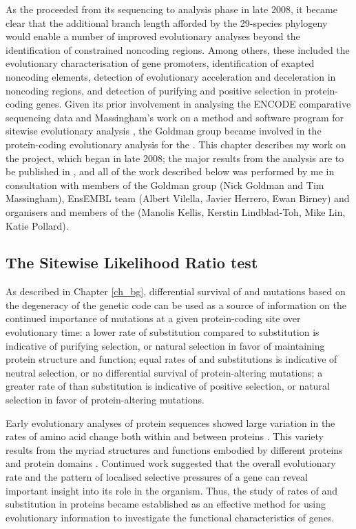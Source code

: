 As the \mgp proceeded from its sequencing to analysis phase in late
2008, it became clear that the additional branch length afforded by
the 29-species phylogeny would enable a number of improved
evolutionary analyses beyond the identification of constrained
noncoding regions. Among others, these included the evolutionary
characterisation of gene promoters, identification of exapted
noncoding elements, detection of evolutionary acceleration and
deceleration in noncoding regions, and detection of purifying and
positive selection in protein-coding genes. Given its prior
involvement in analysing the ENCODE comparative sequencing data
\citep{TODO} and Massingham's work on a method and software program
for sitewise evolutionary analysis \citep{TODO}, the Goldman group
became involved in the protein-coding evolutionary analysis for the
\mgp. This chapter describes my work on the project, which began in
late 2008; the major results from the analysis are to be published in
\citep{TODO}, and all of the work described below was performed by me
in consultation with members of the Goldman group (Nick Goldman and
Tim Massingham), EnsEMBL team (Albert Vilella, Javier Herrero, Ewan
Birney) and organisers and members of the \mgp (Manolis Kellis,
Kerstin Lindblad-Toh, Mike Lin, Katie Pollard).

\subsection{The Sitewise Likelihood Ratio test}

As described in Chapter \ref{ch_bg}, differential survival of \nsyn
and \syn mutations based on the degeneracy of the genetic code can be
used as a source of information on the continued importance of
mutations at a given protein-coding site over evolutionary time: a
lower rate of \nsyn substitution compared to \syn substitution is
indicative of purifying selection, or natural selection in favor of
maintaining protein structure and function; equal rates of \nsyn and
\syn substitutions is indicative of neutral selection, or no
differential survival of protein-altering mutations; a greater rate of
\nsyn than \syn substitution is indicative of positive selection, or
natural selection in favor of protein-altering mutations.

Early evolutionary analyses of protein sequences showed large
variation in the rates of amino acid change both within and between
proteins \citep{TODO}. This variety results from the myriad structures
and functions embodied by different proteins and protein domains
\citep{TODO}. Continued work suggested that the overall evolutionary
rate \cite{TODO,Koonin?} and the pattern of localised selective
pressures \cite{TODO} of a gene can reveal important insight into its
role in the organism. Thus, the study of rates of \nsyn and \syn
substitution in proteins became established as an effective method for
using evolutionary information to investigate the functional
characteristics of genes.

